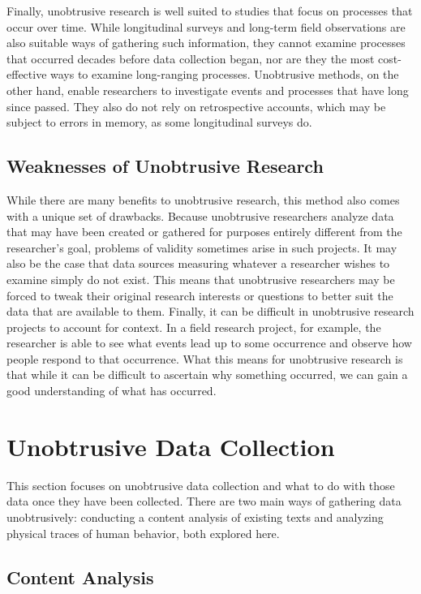 Finally, unobtrusive research is well suited to studies that focus on processes that occur over time. While longitudinal surveys and long-term field observations are also suitable ways of gathering such information, they cannot examine processes that occurred decades before data collection began, nor are they the most cost-effective ways to examine long-ranging processes. Unobtrusive methods, on the other hand, enable researchers to investigate events and processes that have long since passed. They also do not rely on retrospective accounts, which may be subject to errors in memory, as some longitudinal surveys do.

\subsection{Weaknesses of Unobtrusive Research}

While there are many benefits to unobtrusive research, this method also comes with a unique set of drawbacks. Because unobtrusive researchers analyze data that may have been created or gathered for purposes entirely different from the researcher's goal, problems of validity sometimes arise in such projects. It may also be the case that data sources measuring whatever a researcher wishes to examine simply do not exist. This means that unobtrusive researchers may be forced to tweak their original research interests or questions to better suit the data that are available to them. Finally, it can be difficult in unobtrusive research projects to account for context. In a field research project, for example, the researcher is able to see what events lead up to some occurrence and observe how people respond to that occurrence. What this means for unobtrusive research is that while it can be difficult to ascertain why something occurred, we can gain a good understanding of what has occurred.

\section{Unobtrusive Data Collection}

This section focuses on unobtrusive data collection and what to do with those data once they have been collected. There are two main ways of gathering data unobtrusively: conducting a content analysis of existing texts and analyzing physical traces of human behavior, both explored here.

\subsection{Content Analysis}

